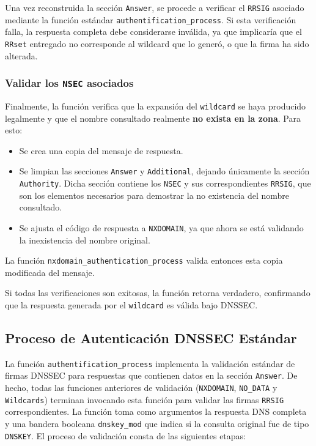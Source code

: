 Una vez reconstruida la sección \texttt{Answer}, se procede a verificar el \texttt{RRSIG} asociado mediante la función estándar \texttt{authentification\_process}.
Si esta verificación falla, la respuesta completa debe considerarse inválida, ya que implicaría que el \texttt{RRset} entregado no corresponde al wildcard que lo generó, o que la firma ha sido alterada.

\subsubsection{Validar los \texttt{NSEC} asociados}

Finalmente, la función verifica que la expansión del \texttt{wildcard} se haya producido legalmente y que el nombre consultado realmente \textbf{no exista en la zona}.
Para esto:
\begin{itemize}
    \item Se crea una copia del mensaje de respuesta.
    \item Se limpian las secciones \texttt{Answer} y \texttt{Additional}, dejando únicamente la sección \texttt{Authority}.
          Dicha sección contiene los \texttt{NSEC} y sus correspondientes \texttt{RRSIG}, que son los elementos necesarios para demostrar la no existencia del nombre consultado.
    \item Se ajusta el código de respuesta a \texttt{NXDOMAIN}, ya que ahora se está validando la inexistencia del nombre original.
\end{itemize}

La función \texttt{nxdomain\_authentication\_process} valida entonces esta copia modificada del mensaje.

Si todas las verificaciones son exitosas, la función retorna verdadero, confirmando que la respuesta generada por el \texttt{wildcard} es válida bajo DNSSEC.


\subsection{Proceso de Autenticación DNSSEC Estándar}

La función \texttt{authentification\_process} implementa la validación estándar de firmas DNSSEC para respuestas que contienen datos en la sección \texttt{Answer}.
De hecho, todas las funciones anteriores de validación  (\texttt{NXDOMAIN}, \texttt{NO\_DATA} y \texttt{Wildcards}) terminan invocando esta función para validar las firmas \texttt{RRSIG}
correspondientes. La función toma como argumentos la respuesta DNS completa y una bandera booleana \texttt{dnskey\_mod} que indica si la consulta original fue de tipo \texttt{DNSKEY}.
El proceso de validación consta de las siguientes etapas:



